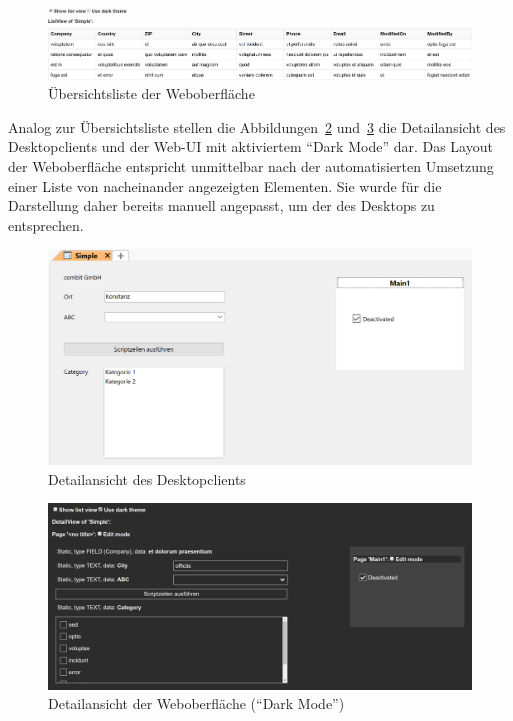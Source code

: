 \begin{figure}[htb]
    \centering
    \captionsetup{justification=centering}
    \includegraphics[width=\textwidth]{figures/listview_new.png}
        \caption{Übersichtsliste der Weboberfläche}\label{fig:listview_new}
\end{figure}

\clearpage{}

Analog zur Übersichtsliste stellen die Abbildungen~\ref{fig:detailview_crm} und~\ref{fig:detailview_new} die Detailansicht des Desktopclients und der Web-UI mit aktiviertem \enquote{Dark Mode} dar. Das Layout der Weboberfläche entspricht unmittelbar nach der automatisierten Umsetzung einer Liste von nacheinander angezeigten Elementen. Sie wurde für die Darstellung daher bereits manuell angepasst, um der des Desktops zu entsprechen.

\begin{figure}[htb]
    \centering
    \captionsetup{justification=centering}
    \includegraphics[width=\textwidth]{figures/detailview_crm.png}
        \caption{Detailansicht des Desktopclients}\label{fig:detailview_crm}
\end{figure}

\begin{figure}[htb]
    \centering
    \captionsetup{justification=centering}
    \includegraphics[width=\textwidth]{figures/detailview_new.png}
        \caption{Detailansicht der Weboberfläche (\enquote{Dark Mode})}\label{fig:detailview_new}
\end{figure}

